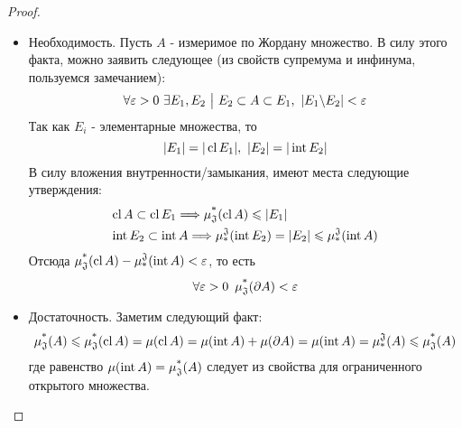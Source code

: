 \begin{proof}
	\begin{itemize}
		\item Необходимость. Пусть $A$ - измеримое по Жордану множество. В силу этого факта, можно заявить следующее (из свойств супремума и инфинума, пользуемся замечанием):
		\[
			\forall \eps > 0\ \exists E_1, E_2 \such E_2 \subset A \subset E_1,\ |E_1 \bs E_2| < \eps
		\]
		Так как $E_i$ - элементарные множества, то
		\[
			|E_1| = |\cl E_1|,\ |E_2| = |\Int E_2|
		\]
		В силу вложения внутренности/замыкания, имеют места следующие утверждения:
		\begin{align*}
			&{\cl A \subset \cl E_1 \Lora \upjm(\cl A) \le |E_1|}
			\\
			&{\Int E_2 \subset \Int A \Lora \downjm(\Int E_2) = |E_2| \le \downjm(\Int A)}
		\end{align*}
		Отсюда $\upjm(\cl A) - \downjm(\Int A) < \eps$, то есть
		\[
			\forall \eps > 0\ \upjm(\vdelta A) < \eps
		\]
		
		\item Достаточность. Заметим следующий факт:
		\[
			\upjm(A) \le \upjm(\cl A) = \mu(\cl A) = \mu(\Int A) + \mu(\vdelta A) = \mu(\Int A) = \downjm(A) \le \upjm(A)
		\]
		где равенство $\mu(\Int A) = \upjm(A)$ следует из свойства для ограниченного открытого множества.
	\end{itemize}
\end{proof}

